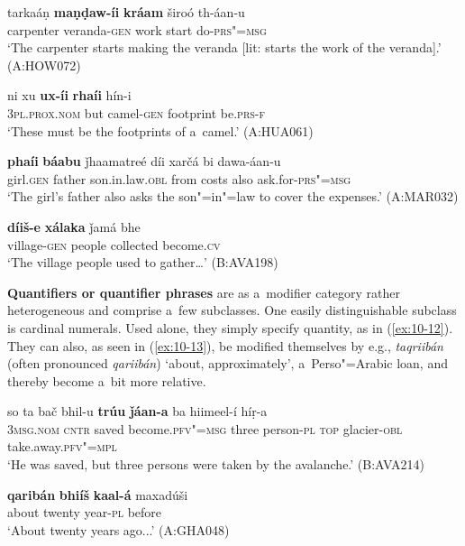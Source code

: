 \begin{exe}
\ex
\label{ex:10-8}
\gll tarkaáṇ \textbf{maṇḍaw-íi} \textbf{kráam} široó th-áan-u  \\
carpenter veranda-\textsc{gen} work start do-\textsc{prs"=msg} \\
\glt `The carpenter starts making the veranda [lit: starts the work of the veranda].' (A:HOW072)

\ex
\label{ex:10-9}
\gll ni xu \textbf{ux-íi} \textbf{rhaíi} hín-i \\
\textsc{3pl.prox.nom} but camel-\textsc{gen} footprint be.\textsc{prs-f}  \\
\glt `These must be the footprints of a~camel.' (A:HUA061)

\ex
\label{ex:10-10}
\gll \textbf{phaíi} \textbf{báabu} ǰhaamatreé díi xarčá bi dawa-áan-u \\
girl.\textsc{gen} father son.in.law.\textsc{obl} from costs also ask.for-\textsc{prs"=msg} \\
\glt `The girl's father also asks the son"=in"=law to cover the expenses.' (A:MAR032)

\ex
\label{ex:10-11}
\gll \textbf{díiš-e} \textbf{xálaka} ǰamá bhe \\
village-\textsc{gen} people collected become.\textsc{cv} \\
\glt `The village people used to gather{\ldots}' (B:AVA198)
\end{exe}


\textbf{Quantifiers or quantifier phrases} are as a~modifier category rather heterogeneous and comprise a~few subclasses. One easily distinguishable subclass is cardinal numerals. Used alone, they simply specify quantity, as in (\ref{ex:10-12}). They can also, as seen in (\ref{ex:10-13}), be modified themselves by e.g., \textit{taqriibán} (often pronounced \textit{qariibán}) `about, approximately', a~Perso"=Arabic loan, and thereby become a~bit more relative.

\begin{exe}
\ex
\label{ex:10-12}
\gll so ta bač bhil-u \textbf{trúu} \textbf{ǰáan-a} ba hiimeel-í híṛ-a  \\
\textsc{3msg.nom} \textsc{cntr} saved become.\textsc{pfv"=msg} three  person-\textsc{pl} \textsc{top} glacier-\textsc{obl} take.away.\textsc{pfv"=mpl} \\
\glt `He was saved, but three persons were taken by the avalanche.' (B:AVA214)

\ex
\label{ex:10-13}
\gll \textbf{qaribán} \textbf{bhiíš} \textbf{kaal-á} maxadúši  \\
about twenty year-\textsc{pl} before \\
\glt `About twenty years ago...' (A:GHA048)
\end{exe}

